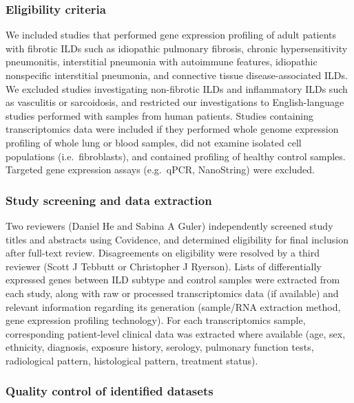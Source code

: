 \documentclass[
]{article}
\begin{document}
\subsubsection{Eligibility criteria}\label{eligibility-criteria}

We included studies that performed gene expression profiling of adult patients with fibrotic ILDs such as idiopathic pulmonary fibrosis, chronic hypersensitivity pneumonitis, interstitial pneumonia with autoimmune features, idiopathic nonspecific interstitial pneumonia, and connective tissue disease-associated ILDs. We excluded studies investigating non-fibrotic ILDs and inflammatory ILDs such as vasculitis or sarcoidosis, and restricted our investigations to English-language studies performed with samples from human patients. Studies containing transcriptomics data were included if they performed whole genome expression profiling of whole lung or blood samples, did not examine isolated cell populations (i.e.~fibroblasts), and contained profiling of healthy control samples. Targeted gene expression assays (e.g.~qPCR, NanoString) were excluded.

\subsubsection{Study screening and data extraction}\label{study-screening-and-data-extraction}

Two reviewers (Daniel He and Sabina A Guler) independently screened study titles and abstracts using Covidence, and determined eligibility for final inclusion after full-text review. Disagreements on eligibility were resolved by a third reviewer (Scott J Tebbutt or Christopher J Ryerson). Lists of differentially expressed genes between ILD subtype and control samples were extracted from each study, along with raw or processed transcriptomics data (if available) and relevant information regarding its generation (sample/RNA extraction method, gene expression profiling technology). For each transcriptomics sample, corresponding patient-level clinical data was extracted where available (age, sex, ethnicity, diagnosis, exposure history, serology, pulmonary function tests, radiological pattern, histological pattern, treatment status).

\subsubsection{Quality control of identified datasets}\label{qc}
\end{document}
